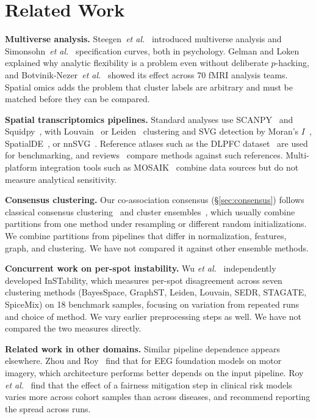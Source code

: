 \section{Related Work}
\label{sec:related}

\textbf{Multiverse analysis.}
Steegen~\emph{et al.}~\cite{steegen2016increasing} introduced multiverse
analysis and Simonsohn~\emph{et al.}~\cite{simonsohn2020specification}
specification curves, both in psychology. Gelman and
Loken~\cite{gelman2013garden} explained why analytic flexibility is a
problem even without deliberate $p$-hacking, and
Botvinik-Nezer~\emph{et al.}~\cite{botvinik2020variability} showed its
effect across 70 fMRI analysis teams. Spatial omics adds the problem that
cluster labels are arbitrary and must be matched before they can be
compared.

\textbf{Spatial transcriptomics pipelines.} Standard analyses use
SCANPY~\cite{wolf2018scanpy} and Squidpy~\cite{palla2022squidpy}, with
Louvain~\cite{blondel2008fast} or
Leiden~\cite{traag2019louvain,traag2011narrow} clustering and SVG detection
by Moran's $I$~\cite{moran1950notes},
SpatialDE~\cite{svensson2018spatialde}, or nnSVG~\cite{weber2023nnsvg}.
Reference atlases such as the DLPFC dataset~\cite{maynard2021transcriptome}
are used for benchmarking, and reviews~\cite{luecken2019current} compare
methods against such references. Multi-platform integration tools such as
MOSAIK~\cite{baptista2025mosaik} combine data sources but do not measure
analytical sensitivity.

\textbf{Consensus clustering.} Our co-association consensus
(\S\ref{sec:consensus}) follows classical consensus
clustering~\cite{monti2003consensus} and cluster
ensembles~\cite{strehl2002cluster}, which usually combine partitions from
one method under resampling or different random initializations. We
combine partitions from pipelines that differ in normalization, features,
graph, and clustering. We have not compared it against other ensemble
methods.

\textbf{Concurrent work on per-spot instability.} Wu
\emph{et al.}~\cite{wu2026instability} independently developed InSTability,
which measures per-spot disagreement across seven clustering methods
(BayesSpace, GraphST, Leiden, Louvain, SEDR, STAGATE, SpiceMix) on 18
benchmark samples, focusing on variation from repeated runs and choice of
method. We vary earlier preprocessing steps as well. We have not compared
the two measures directly.

\textbf{Related work in other domains.} Similar pipeline dependence appears
elsewhere. Zhou and Roy~\cite{zhou2026matched} find that for EEG foundation
models on motor imagery, which architecture performs better depends on the
input pipeline. Roy \emph{et al.}~\cite{roy2026kaisen} find that the effect
of a fairness mitigation step in clinical risk models varies more across
cohort samples than across diseases, and recommend reporting the spread
across runs.

